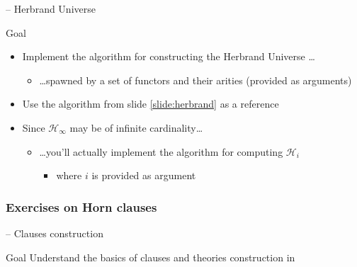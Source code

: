 \documentclass[presentation]{beamer}\mode<presentation>{\usetheme{AMSBolognaFC}}
\begin{document}
\begin{frame}{\currentExercise{} -- Herbrand Universe}
    \label{slide:second-exercise-on-terms}

    \begin{block}{Goal}
        \begin{itemize}
            \item Implement the algorithm for constructing the Herbrand Universe \ldots
            \begin{itemize}
                \item \ldots spawned by a set of functors and their arities (provided as arguments)
            \end{itemize}

            \item Use the algorithm from slide \ref{slide:herbrand} as a reference
            
            \item Since $\mathcal{H}_\infty$ may be of infinite cardinality\ldots
            \begin{itemize}
                \item \ldots you'll actually implement the algorithm for computing $\mathcal{H}_i$
                \begin{itemize}
                    \item where $i$ is provided as argument
                \end{itemize}
            \end{itemize}
        \end{itemize}
    \end{block}
\end{frame}

\subsubsection{Exercises on Horn clauses}

\startExercise{}

\begin{frame}{\currentExercise{} -- Clauses construction}
    \label{slide:first-exercise-on-clauses}
    \begin{block}{Goal}
        Understand the basics of clauses and theories construction in \twopkt{}
    \end{block}
    
\end{frame}
\end{document}
